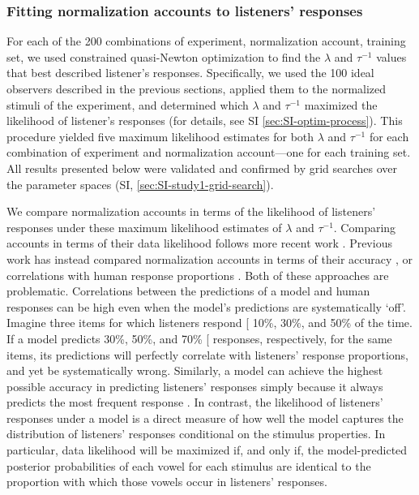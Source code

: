 \documentclass[preprint]{JASA}
\begin{document}
\subsubsection{Fitting normalization accounts to listeners' responses}\label{sec:fitting-accounts}

For each of the 200 combinations of experiment, normalization account, training set, we used constrained quasi-Newton optimization \citep[as implemented in \texttt{R}'s \texttt{optim()} function]{byrd1995} to find the \(\lambda\) and \(\tau^{-1}\) values that best described listener's responses. Specifically, we used the 100 ideal observers described in the previous sections, applied them to the normalized stimuli of the experiment, and determined which \(\lambda\) and \(\tau^{-1}\) maximized the likelihood of listener's responses (for details, see SI \ref{sec:SI-optim-process}). This procedure yielded five maximum likelihood estimates for both \(\lambda\) and \(\tau^{-1}\) for each combination of experiment and normalization account---one for each training set. All results presented below were validated and confirmed by grid searches over the parameter spaces (SI, \ref{sec:SI-study1-grid-search}).

We compare normalization accounts in terms of the likelihood of listeners' responses under these maximum likelihood estimates of \(\lambda\) and \(\tau^{-1}\). Comparing accounts in terms of their data likelihood follows more recent work \citep[e.g.,][]{barreda2021, mcmurray-jongman2011, richter2017, xie2023}. Previous work has instead compared normalization accounts in terms of their accuracy \citep[e.g.,][]{johnson2020, nearey-assmann2007, persson-jaeger2023}, or correlations with human response proportions \citep[e.g.,][]{nearey-assmann1986, hillenbrand-nearey1999}. Both of these approaches are problematic. Correlations between the predictions of a model and human responses can be high even when the model's predictions are systematically `off'. Imagine three items for which listeners respond {[}\textipa{I}{]} 10\%, 30\%, and 50\% of the time. If a model predicts 30\%, 50\%, and 70\% {[}\textipa{I}{]} responses, respectively, for the same items, its predictions will perfectly correlate with listeners' response proportions, and yet be systematically wrong. Similarly, a model can achieve the highest possible accuracy in predicting listeners' responses simply because it always predicts the most frequent response \citep[see discussion of criterion choice rule in][]{massaro-friedman1990}. In contrast, the likelihood of listeners' responses under a model is a direct measure of how well the model captures the distribution of listeners' responses conditional on the stimulus properties. In particular, data likelihood will be maximized if, and only if, the model-predicted posterior probabilities of each vowel for each stimulus are identical to the proportion with which those vowels occur in listeners' responses.
\end{document}
